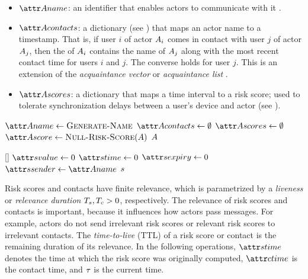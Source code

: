 \begin{itemize}
	\item $\aActorName$: an identifier that enables actors to communicate with it \cite{Hewitt1977, Agha1985}.
	\item $\aActorContacts$: a dictionary (see ) that maps an actor name to a timestamp. That is, if user $i$ of actor $A_i$ comes in contact with user $j$ of actor $A_j$, then the  of $A_i$ contains the name of $A_j$ along with the most recent contact time for users $i$ and $j$. The converse holds for user $j$. This is an extension of the \emph{acquaintance vector} \cite{Hewitt1977} or \emph{acquaintance list} \cite{Agha1985}.
	\item $\aActorScores$: a dictionary that maps a time interval to a risk score; used to tolerate synchronization delays between a user's device and actor (see ).
\end{itemize}
%
\begin{function}{\nInitializeActor}
    \State $\aActorName \assign \cGenerateName$
    \State $\aActorContacts \assign \emptyset$
    \State $\aActorScores \assign \emptyset$
    \State $\aActorScore \assign \cNullRiskScore[\vActor]$
    \State \Return $A$
\end{function}
%
\begin{function}{\nNullRiskScore}[\vActor]
    \State $\aScoreValue \assign 0$
    \State $\aScoreTime \assign 0$
    \State $\aScoreExpiry \assign 0$
    \State $\aScoreSender \assign \aActorName$
    \State \Return $s$
\end{function}
%
Risk scores and contacts have finite relevance, which is parametrized by a \emph{liveness} or \emph{relevance duration} $T_s, T_c > 0$, respectively. The relevance of risk scores and contacts is important, because it influences how actors pass messages. For example, actors do not send irrelevant risk scores or relevant risk scores to irrelevant contacts. The \emph{time-to-live} (TTL) of a risk score or contact is the remaining duration of its relevance. In the following operations, $\aScoreTime$ denotes the time at which the risk score was originally computed, $\aContactTime$ is the contact time, and $\tau$ is the current time.
